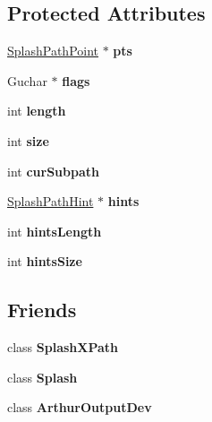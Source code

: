 \subsection*{Protected Attributes}
\begin{DoxyCompactItemize}
\item 
\mbox{\label{class_splash_path_aeeacc2d2e32ed9c2a0bd1150473f700b}} 
\hyperlink{struct_splash_path_point}{Splash\+Path\+Point} $\ast$ {\bfseries pts}
\item 
\mbox{\label{class_splash_path_acb3994eb01203895a0e44487ef21c2bf}} 
Guchar $\ast$ {\bfseries flags}
\item 
\mbox{\label{class_splash_path_a84403c7acf2f516bd375bae1553d23c3}} 
int {\bfseries length}
\item 
\mbox{\label{class_splash_path_adf0f6b00726b92c4c1d67e4afadf0ccf}} 
int {\bfseries size}
\item 
\mbox{\label{class_splash_path_ac2608f06e4f1eca17a86a6bea8fc0f21}} 
int {\bfseries cur\+Subpath}
\item 
\mbox{\label{class_splash_path_ab00ae1c203dabeddc318356483dd87d2}} 
\hyperlink{struct_splash_path_hint}{Splash\+Path\+Hint} $\ast$ {\bfseries hints}
\item 
\mbox{\label{class_splash_path_aba3aaa9a2808126a1768d695ceae61b8}} 
int {\bfseries hints\+Length}
\item 
\mbox{\label{class_splash_path_a8636030b27f60efc93a1b3d608d70c4c}} 
int {\bfseries hints\+Size}
\end{DoxyCompactItemize}
\subsection*{Friends}
\begin{DoxyCompactItemize}
\item 
\mbox{\label{class_splash_path_a87837cf54a19d4ee0b95aa44c631da6a}} 
class {\bfseries Splash\+X\+Path}
\item 
\mbox{\label{class_splash_path_a6216f93151b4bec4a72771c40ff08ae8}} 
class {\bfseries Splash}
\item 
\mbox{\label{class_splash_path_a72a94301d80096ecf4a5f6e7d69702fd}} 
class {\bfseries Arthur\+Output\+Dev}
\end{DoxyCompactItemize}


